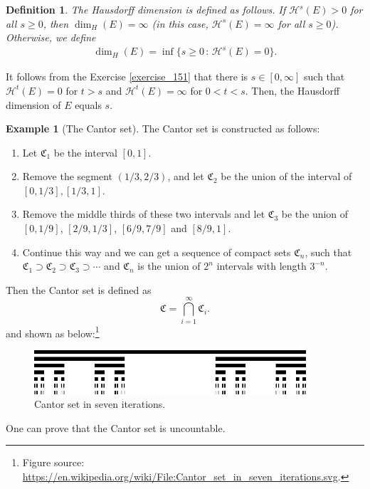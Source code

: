 \documentclass[11pt]{book}
\newtheorem{definition}{Definition}[chapter]
\theoremstyle{definition}
\newtheorem{example}{Example}[chapter]
\numberwithin{equation}{chapter}
\def\CC{\mathfrak{C}}
\begin{document}
\medskip

\begin{definition}
The Hausdorff dimension is defined as follows. If $\mathcal{H}^s(E) > 0$ for all $s \geq 0$, then $\dim_{H}(E) = \infty$ (in this case, $\mathcal{H}^s(E) = \infty$ for all $s \geq 0$). Otherwise, we define
\begin{align*}
    \dim_{H}(E) = \inf \{s \geq 0\, :\, \mathcal{H}^s(E) = 0 \}.
\end{align*}
\end{definition}

It follows from the Exercise \ref{exercise_151} that there is $s \in [0,\infty]$ such that $\mathcal{H}^t(E) = 0$ for $t > s$ and $\mathcal{H}^t(E) = \infty$ for $0 < t < s$. Then, the Hausdorff dimension of $E$ equals $s$.

\medskip

\begin{example}[The Cantor set]
The Cantor set is constructed as follows:
\begin{enumerate}[label=(\alph*)]
    \item Let $\CC_1$ be the interval $[0,1]$.
    \item Remove the segment $\left(1/3,2/3\right)$, and let $\CC_2$ be the union of the interval of $\left[0,1/3\right],\left[1/3,1\right]$.
    \item Remove the middle thirds of these two intervals and let $\CC_3$ be the union of $\left[0,1/9\right]$, $\left[2/9,1/3\right]$, $\left[6/9,7/9\right]$ and $\left[8/9,1\right]$.
    \item Continue this way and we can get a sequence of compact sets $\CC_n$, such that $\CC_1\supset \CC_2\supset \CC_3\supset\cdots$ and $\CC_n$ is the union of $2^n$ intervals with length $3^{-n}$.
\end{enumerate}
Then the Cantor set is defined as $$\CC = \bigcap^\infty_{i=1}\CC_i.$$ and shown as below:\footnote{Figure source: \url{https://en.wikipedia.org/wiki/File:Cantor_set_in_seven_iterations.svg}.}
\begin{figure}[H]
    \centering
    \includegraphics[width=0.9\textwidth]{Cantor_set_in_seven_iterations}
    \caption{Cantor set in seven iterations.}
    \label{fig:Cantor_set}
\end{figure}
One can prove that the Cantor set is uncountable. 
\end{example}
\end{document}
